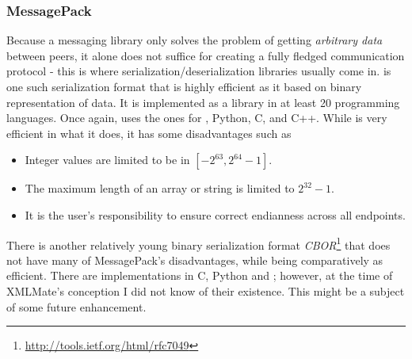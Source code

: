 \subsubsection{MessagePack}
Because a messaging library only solves the problem of getting \emph{arbitrary data} between peers, it 
alone does not suffice for creating a fully fledged communication protocol - this is where serialization/deserialization libraries 
usually come in. \msgpack\cite{msgpack} is one such serialization format that is highly efficient as it based on 
binary representation of data. It is implemented as a library in at least 20 programming languages. 
Once again, \xmlmate uses the ones for \java, {\small Python}, {\small C}, and {\small C++}.
While \msgpack is very efficient in what it does, it has some disadvantages such as 
\begin{itemize}
  \item Integer values are limited to be in $[-2^{63}, 2^{64}-1]$.
  \item The maximum length of an array or string is limited to $2^{32}-1$.
  \item It is the user's responsibility to ensure correct endianness across all endpoints.
\end{itemize}

There is another relatively young binary serialization format \emph{CBOR}\footnote{\url{http://tools.ietf.org/html/rfc7049}} 
that does not have many of {\small MessagePack's} disadvantages, while being comparatively as efficient.
There are implementations in {\small C}, {\small Python} and \java; however, at the time of {\small XMLMate's}
conception I did not know of their existence. This might be a subject of some future enhancement.
